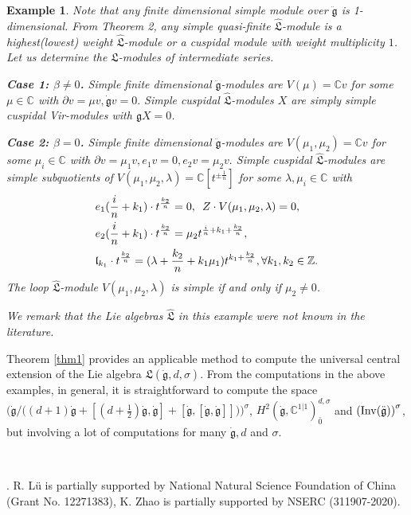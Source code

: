 \documentclass[1p]{elsarticle}
\numberwithin{equation}{section}
\def\dg{\dot{\mathfrak{g}}}
\def\ddg{\ddot{\mathfrak{g}}}
\def\fg{\mathfrak{g}}
\def\fL{\mathfrak{L}}
\def\bC{\mathbb{C}}
\def\bZ{\mathbb{Z}}
\def\Inv{{\rm Inv}}
\def\fl{\mathfrak{l}}
\def\hL{\hat{\fL}}
\newtheorem{exam}{Example}
\begin{document}
\begin{exam}
	Note that any finite dimensional simple module over $\ddg$ is 1-dimensional.
	From Theorem 2, any simple quasi-finite $\hL$-module is a highest(lowest) weight $\hL$-module or a cuspidal module with weight multiplicity $1$. Let us determine the $\hL$-modules of intermediate series. 
	
	{\bf Case 1: $\beta\ne0$.} Simple finite dimensional $\ddg$-modules are $V(\mu)=\bC v$ for some $\mu\in\bC$ with $\partial v=\mu v, \dg v=0.$ Simple cuspidal $\hL$-modules $X$ are simply simple cuspidal Vir-modules with $\mathfrak{g} X=0$.
	
		{\bf Case 2: $\beta=0$.} Simple finite dimensional $\ddg$-modules are $V(\mu_1, \mu_2)=\bC v$ for some $\mu_i\in\bC$ with $\partial v=\mu_1 v, e_1 v=0, e_2 v=\mu_2 v.$ Simple cuspidal $\hL$-modules are simple subquotients of $V(\mu_1, \mu_2, \lambda)=\bC[t^{\pm \frac1n}]$ for some $\lambda,\mu_i\in\bC$  with  
		$$\aligned &e_1(\frac {i}n+k_1)\cdot t^{\frac{k_2}n}=0,\,\,\, Z\cdot V(\mu_1, \mu_2, \lambda) =0, \\ &e_2(\frac {i}n+k_1)\cdot t^{\frac{k_2}{n}}=\mu_2t^{\frac {i}n+k_1+\frac{k_2}{n}},\\
		&\fl_{k_1}\cdot t^{\frac{k_2}{n}}=(\lambda+\frac{k_2}{n}+k_1\mu_1)t^{ {k_1}+\frac{k_2}{n}}, \forall k_1, k_2\in\bZ.
		\endaligned$$
	The loop $\hL$-module $V(\mu_1, \mu_2, \lambda)$ is simple if and only if $\mu_2\ne0$.
	
	
	
	 We remark that the Lie algebras  $\hL$ in this example were not known in the literature.
\end{exam}



Theorem \ref{thm1} provides an applicable method to compute the universal central extension of the Lie algebra $\fL(\dg, d, \sigma)$. From the computations in the above examples, in general, it is straightforward to compute the space 
$\Big(\dg/\big((d+1)\dg+[(d+\frac 12)\dg,\dg]+ [\dg,[\dg,\dg]]\big)\Big)^{\sigma}$, $H^2(\dg,\bC^{1|1})_{\bar 0}^{d,\sigma}$ and $ {(\Inv(\ddot{\fg}))}^\sigma$, but involving a lot of computations for many $\dg, d$ and $\sigma$.

\

. R. L\"u is partially supported by National Natural Science Foundation of China (Grant No.
12271383), K. Zhao is  partially supported
by   NSERC
(311907-2020).

\end{document}
